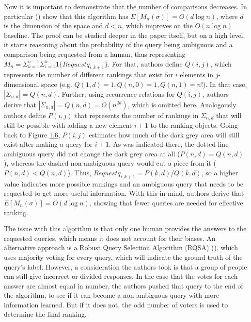 \documentclass[
  letterpaper,
  DIV=11,
  numbers=noendperiod,
  oneside]{scrreprt}
\theoremstyle{remark}
\begin{document}
Now it is important to demonstrate that the number of comparisons
decreases. In particular ()
show that this algorithm has \(E[M_n(\sigma)] = O(d\log n)\), where
\(d\) is the dimension of the space and \(d < n\), which improves on the
\(O(n\log n)\) baseline. The proof can be studied deeper in the paper
itself, but on a high level, it starts reasoning about the probability
of the query being ambiguous and a comparison being requested from a
human, thus representing
\(M_n = \Sigma_{k=1}^{n-1}\Sigma_{i=1}^k 1\{Requestq_{i,k+1}\}\). For
that, authors define \(Q(i,j)\), which represents the number of
different rankings that exist for \(i\) elements in \(j\)-dimensional
space (e.g. \(Q(1,d) = 1, Q(n,0) = 1, Q(n,1) = n!\)). In that case,
\(|\Sigma_{n,d}| = Q(n,d)\). Further, using recurrence relations for
\(Q(i,j)\), authors derive that \(|\Sigma_{n,d}| = Q(n,d) = O(n^{2d})\),
which is omitted here. Analogously authors define \(P(i,j)\) that
represents the number of rankings in \(\Sigma_{n,d}\) that will still be
possible with adding a new element \(i+1\) to the ranking objects. Going
back to Figure \hyperref[fig:dim-space]{1.6}, \(P(i,j)\) estimates how
much of the dark grey area will still exist after making a query for
\(i+1\). As was indicated there, the dotted line ambiguous query did not
change the dark grey area at all (\(P(n,d) = Q(n,d)\)), whereas the
dashed non-ambiguous query would cut a piece from it
(\(P(n,d) < Q(n,d)\)). Thus, \(Request q_{i,k+1} = P(k,d) / Q(k,d)\), so
a higher value indicates more possible rankings and an ambiguous query
that needs to be requested to get more useful information. With this in
mind, authors derive that \(E[M_n(\sigma)] = O(d\log n)\), showing that
fewer queries are needed for effective ranking.

The issue with this algorithm is that only one human provides the
answers to the requested queries, which means it does not account for
their biases. An alternative approach is a Robust Query Selection
Algorithm (RQSA) (), which
uses majority voting for every query, which will indicate the ground
truth of the query's label. However, a consideration the authors took is
that a group of people can still give incorrect or divided responses. In
the case that the votes for each answer are almost equal in number, the
authors pushed that query to the end of the algorithm, to see if it can
become a non-ambiguous query with more information learned. But if it
does not, the odd number of voters is used to determine the final
ranking. \label{section:QSA}{}
\end{document}
